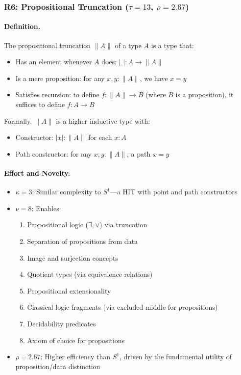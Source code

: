\documentclass[11pt]{article}
\theoremstyle{definition}
\begin{document}
\subsubsection{R6: Propositional Truncation ($\tau=13$, $\rho=2.67$)}

\paragraph{Definition.}
The propositional truncation $\|A\|$ of a type $A$ is a type that:
\begin{itemize}
\item Has an element whenever $A$ does: $|\_| : A \to \|A\|$
\item Is a mere proposition: for any $x, y : \|A\|$, we have $x = y$
\item Satisfies recursion: to define $f : \|A\| \to B$ (where $B$ is a proposition), it suffices to define $f : A \to B$
\end{itemize}

Formally, $\|A\|$ is a higher inductive type with:
\begin{itemize}
\item Constructor: $|x| : \|A\|$ for each $x : A$  
\item Path constructor: for any $x, y : \|A\|$, a path $x = y$
\end{itemize}

\paragraph{Effort and Novelty.}
\begin{itemize}
\item $\kappa = 3$: Similar complexity to $S^1$—a HIT with point and path constructors
\item $\nu = 8$: Enables:
\begin{enumerate}
\item Propositional logic ($\exists, \vee$) via truncation
\item Separation of propositions from data
\item Image and surjection concepts
\item Quotient types (via equivalence relations)
\item Propositional extensionality
\item Classical logic fragments (via excluded middle for propositions)
\item Decidability predicates
\item Axiom of choice for propositions
\end{enumerate}
\item $\rho = 2.67$: Higher efficiency than $S^1$, driven by the fundamental utility of proposition/data distinction
\end{itemize}
\end{document}
